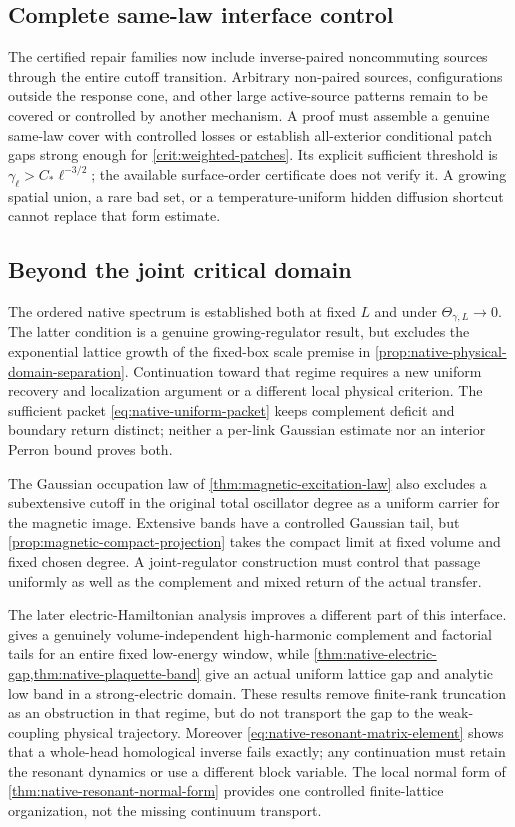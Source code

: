\documentclass[11pt,oneside,openany]{book}
\theoremstyle{definition}
\theoremstyle{remark}
\begin{document}
\subsection{Complete same-law interface control}
The certified repair families now include inverse-paired noncommuting
sources through the entire cutoff transition. Arbitrary non-paired
sources, configurations outside the response cone, and other large
active-source patterns remain to be covered or controlled by another
mechanism. A proof must assemble a genuine same-law cover with
controlled losses or establish all-exterior conditional patch gaps
strong enough for \cref{crit:weighted-patches}. Its explicit sufficient
threshold is $\gamma_\ell>C_*\ell^{-3/2}$; the available surface-order
certificate does not verify it. A growing spatial union, a rare bad
set, or a temperature-uniform hidden diffusion shortcut cannot replace
that form estimate.

\subsection{Beyond the joint critical domain}
The ordered native spectrum is established both at fixed $L$ and
under $\Theta_{\gamma,L}\to0$. The latter condition is a genuine
growing-regulator result, but excludes the exponential lattice growth
of the fixed-box scale premise in
\cref{prop:native-physical-domain-separation}. Continuation toward
that regime requires a new uniform recovery and localization
argument or a different local physical criterion. The sufficient
packet \cref{eq:native-uniform-packet} keeps complement deficit and
boundary return distinct; neither a per-link Gaussian estimate nor
an interior Perron bound proves both.

The Gaussian occupation law of \cref{thm:magnetic-excitation-law}
also excludes a subextensive cutoff in the original total oscillator
degree as a uniform carrier for the magnetic image. Extensive bands
have a controlled Gaussian tail, but
\cref{prop:magnetic-compact-projection} takes the compact limit at
fixed volume and fixed chosen degree. A joint-regulator construction
must control that passage uniformly as well as the complement and
mixed return of the actual transfer.

The later electric-Hamiltonian analysis improves a different part of
this interface.   gives a genuinely
volume-independent high-harmonic complement and factorial tails for an
entire fixed low-energy window, while
\cref{thm:native-electric-gap,thm:native-plaquette-band} give an actual
uniform lattice gap and analytic low band in a strong-electric domain.
These results remove finite-rank truncation as an obstruction in that
regime, but do not transport the gap to the weak-coupling physical
trajectory.  Moreover \cref{eq:native-resonant-matrix-element} shows
that a whole-head homological inverse fails exactly; any continuation
must retain the resonant dynamics or use a different block variable.
The local normal form of \cref{thm:native-resonant-normal-form} provides
one controlled finite-lattice organization, not the missing continuum
transport.
\end{document}
